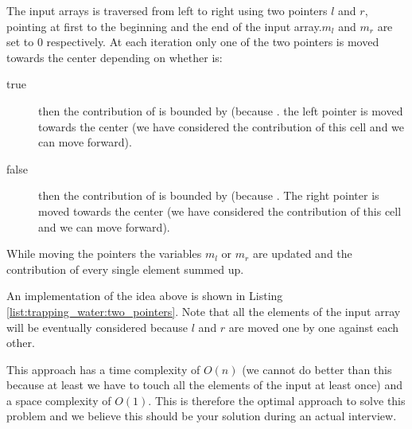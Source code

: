 The input arrays is traversed from left to right using two pointers $l$ and $r$, pointing at first to the beginning and the end of the input array.$m_l$ and $m_r$ are set to $0$ respectively. At each iteration only one of the two pointers is moved towards the center depending on whether  is:
\begin{description}
\item[true]  then the contribution of  is bounded by  (because . the left pointer is moved towards the center (we have considered the contribution of this cell and we can move forward).\\
\item[false] then the contribution of  is bounded by  (because . The right pointer is moved towards the center (we have considered the contribution of this cell and we can move forward). \\
\end{description}

While moving the pointers the variables $m_l$ or $m_r$ are updated and the contribution of every single element summed up.

An implementation of the idea above is shown in Listing \ref{list:trapping_water:two_pointers}. Note that all the elements of the input array will be eventually considered because $l$ and $r$ are moved one by one against each other. 



This approach has a time complexity of $O(n)$ (we cannot do better than this because at least we have to touch all the elements of the input at least once) and a space complexity of $O(1)$. This is therefore the optimal approach to solve this problem  and we believe this should be your solution during an actual interview.



